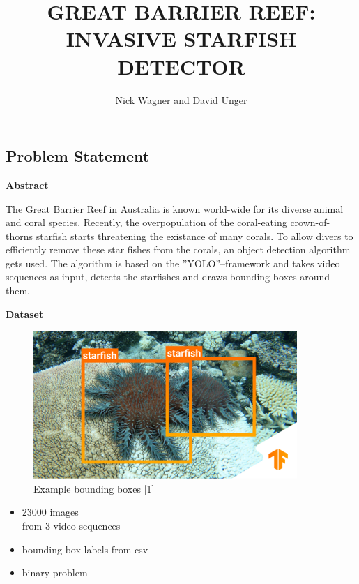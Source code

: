 \documentclass[landscape,a2,final,12pt]{issposter}
\title{\MakeUppercase{Great Barrier Reef: Invasive Starfish Detector}}
\author{Nick Wagner and David Unger}
\institute{Institute of Signal Processing and System Theory, University of Stuttgart, Germany}
\begin{document}
\maketitle

\raggedright
\raggedbottom
\raggedcolumns
\begin{multicols}{3}
\begin{samepage}
\section{Problem Statement}
    \textbf{Abstract}\\
    \begin{small} The Great Barrier Reef in Australia is known world-wide for its diverse animal and coral species.
        Recently, the overpopulation of the coral-eating crown-of-thorns starfish starts threatening the existance of many corals.
        To allow divers to efficiently remove these star fishes from the corals, an object detection algorithm gets used. \newline
        The algorithm is based on the ''YOLO''--framework and takes video sequences as input, detects the starfishes and draws bounding boxes around them.\\
    \end{small}
    \vspace{0.5cm}
    \textbf{Dataset}
    \begin{figure}
    \centering
        \includegraphics[scale=0.8]{1_starfishes.png}
        \caption{Example bounding boxes [1]}
    \end{figure} 
    \vspace*{-0.5cm}
    \begin{small}
    \begin{itemize}
        \item \raisebox{-0.6ex}{\~{}}23000 images\\ from 3 video sequences
        \item bounding box labels from csv
        \item binary problem
    \end{itemize}
    \end{small}
\end{samepage}
    \columnbreak

\end{multicols}
\end{document}
